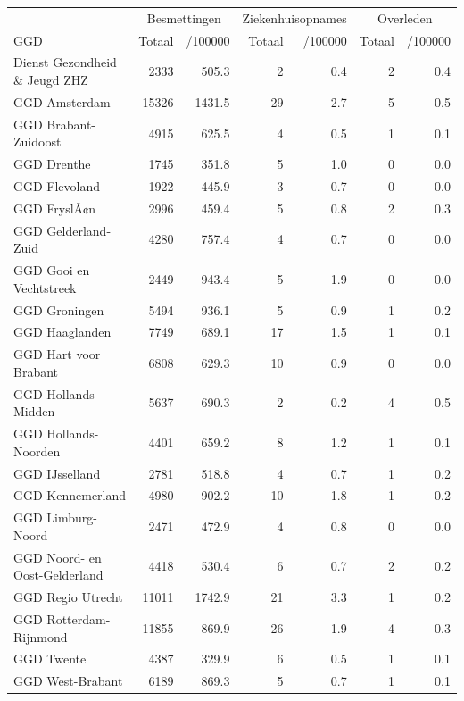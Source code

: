 \documentclass[
  english,
  man,floatsintext]{apa6}
\begin{document}
\begin{table}
\centering\begingroup\fontsize{10}{12}\selectfont

\begin{threeparttable}
\begin{tabular}{lrrrrrr}
\toprule
\multicolumn{1}{c}{ } & \multicolumn{2}{c}{Besmettingen} & \multicolumn{2}{c}{Ziekenhuisopnames} & \multicolumn{2}{c}{Overleden} \\
\cmidrule(l{3pt}r{3pt}){2-3} \cmidrule(l{3pt}r{3pt}){4-5} \cmidrule(l{3pt}r{3pt}){6-7}
GGD & Totaal & /100000 & Totaal & /100000 & Totaal & /100000\\
\midrule
Dienst Gezondheid \& Jeugd ZHZ & 2333 & 505.3 & 2 & 0.4 & 2 & 0.4\\
GGD Amsterdam & 15326 & 1431.5 & 29 & 2.7 & 5 & 0.5\\
GGD Brabant-Zuidoost & 4915 & 625.5 & 4 & 0.5 & 1 & 0.1\\
GGD Drenthe & 1745 & 351.8 & 5 & 1.0 & 0 & 0.0\\
GGD Flevoland & 1922 & 445.9 & 3 & 0.7 & 0 & 0.0\\
GGD FryslÃ¢n & 2996 & 459.4 & 5 & 0.8 & 2 & 0.3\\
GGD Gelderland-Zuid & 4280 & 757.4 & 4 & 0.7 & 0 & 0.0\\
GGD Gooi en Vechtstreek & 2449 & 943.4 & 5 & 1.9 & 0 & 0.0\\
GGD Groningen & 5494 & 936.1 & 5 & 0.9 & 1 & 0.2\\
GGD Haaglanden & 7749 & 689.1 & 17 & 1.5 & 1 & 0.1\\
GGD Hart voor Brabant & 6808 & 629.3 & 10 & 0.9 & 0 & 0.0\\
GGD Hollands-Midden & 5637 & 690.3 & 2 & 0.2 & 4 & 0.5\\
GGD Hollands-Noorden & 4401 & 659.2 & 8 & 1.2 & 1 & 0.1\\
GGD IJsselland & 2781 & 518.8 & 4 & 0.7 & 1 & 0.2\\
GGD Kennemerland & 4980 & 902.2 & 10 & 1.8 & 1 & 0.2\\
GGD Limburg-Noord & 2471 & 472.9 & 4 & 0.8 & 0 & 0.0\\
GGD Noord- en Oost-Gelderland & 4418 & 530.4 & 6 & 0.7 & 2 & 0.2\\
GGD Regio Utrecht & 11011 & 1742.9 & 21 & 3.3 & 1 & 0.2\\
GGD Rotterdam-Rijnmond & 11855 & 869.9 & 26 & 1.9 & 4 & 0.3\\
GGD Twente & 4387 & 329.9 & 6 & 0.5 & 1 & 0.1\\
GGD West-Brabant & 6189 & 869.3 & 5 & 0.7 & 1 & 0.1\\

\end{tabular}
\end{threeparttable}
\end{table}
\end{document}
